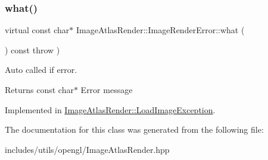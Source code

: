 \subsubsection{\texorpdfstring{what()}{what()}}
{\footnotesize\ttfamily virtual const char$\ast$ Image\+Atlas\+Render\+::\+Image\+Render\+Error\+::what (\begin{DoxyParamCaption}{ }\end{DoxyParamCaption}) const throw  ) \hspace{0.3cm}{\ttfamily [pure virtual]}}



Auto called if error. 

\begin{DoxyReturn}{Returns}
const char$\ast$ Error message 
\end{DoxyReturn}


Implemented in \hyperlink{class_image_atlas_render_1_1_load_image_exception_a1ee59c2d803a898aca5004227916c90c}{Image\+Atlas\+Render\+::\+Load\+Image\+Exception}.



The documentation for this class was generated from the following file\+:\begin{DoxyCompactItemize}
\item 
includes/utils/opengl/Image\+Atlas\+Render.\+hpp\end{DoxyCompactItemize}

